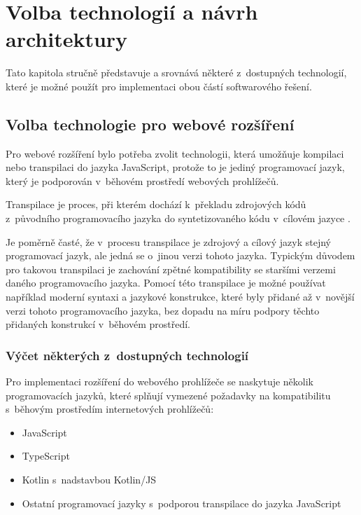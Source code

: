 \chapter{Volba technologií a návrh architektury}

Tato kapitola stručně představuje a srovnává některé z~dostupných technologií, které je možné použít pro implementaci obou částí softwarového řešení. 

\section{Volba technologie pro webové rozšíření}

Pro webové rozšíření bylo potřeba zvolit technologii, která umožňuje kompilaci nebo transpilaci do jazyka JavaScript, protože to je jediný programovací jazyk, který je podporován v~běhovém prostředí webových prohlížečů.

Transpilace je proces, při kterém dochází k~překladu zdrojových kódů z~původního programovacího jazyka do syntetizovaného kódu v~cílovém jazyce \cite{fowler_transparent_2013}. 

Je poměrně časté, že v~procesu transpilace je zdrojový a cílový jazyk stejný programovací jazyk, ale jedná se o~jinou verzi tohoto jazyka. Typickým důvodem pro takovou transpilaci je zachování zpětné kompatibility se staršími verzemi daného programovacího jazyka. Pomocí této transpilace je možné používat například moderní syntaxi a jazykové konstrukce, které byly přidané až v~novější verzi tohoto programovacího jazyka, bez dopadu na míru podpory těchto přidaných konstrukcí v~běhovém prostředí.

\subsection{Výčet některých z~dostupných technologií}

Pro implementaci rozšíření do webového prohlížeče se naskytuje několik programovacích jazyků, které splňují vymezené požadavky na kompatibilitu s~běhovým prostředím internetových prohlížečů:

\begin{itemize}
    \item JavaScript
    \item TypeScript
    \item Kotlin s~nadstavbou Kotlin/JS
    \item Ostatní programovací jazyky s~podporou transpilace do jazyka JavaScript
\end{itemize}

